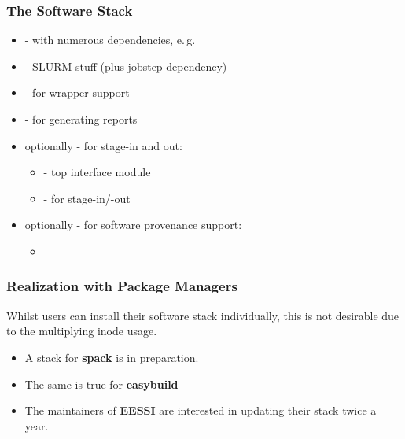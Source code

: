 \begin{frame}[fragile]
	\frametitle{The \Snakemake{} Software Stack}
	\begin{itemize}[<+->]
		\item {} - with numerous dependencies, e.\,g. 
		\item {} - SLURM stuff (plus jobstep dependency)
		\item {} - for wrapper support
		\item {} - for generating reports
		\item optionally - for stage-in and out: 
		\begin{itemize}
			\item {} - top interface module
			\item {} - for stage-in/-out
		\end{itemize}
		\item optionally - for software provenance support:
		\begin{itemize}
			\item {}
		\end{itemize}
	\end{itemize}
\end{frame}

\begin{frame}
	\frametitle{Realization with Package Managers}
	\begin{warning}
		Whilst users can install their software stack individually, this is not desirable due to the multiplying inode usage.
	\end{warning}
	\pause
	\begin{itemize}
		\item A stack for \textbf{spack} is in preparation.
		\item The same is true for \textbf{easybuild}
		\item The maintainers of \textbf{EESSI} are interested in updating their stack twice a year. 
	\end{itemize}
\end{frame}


